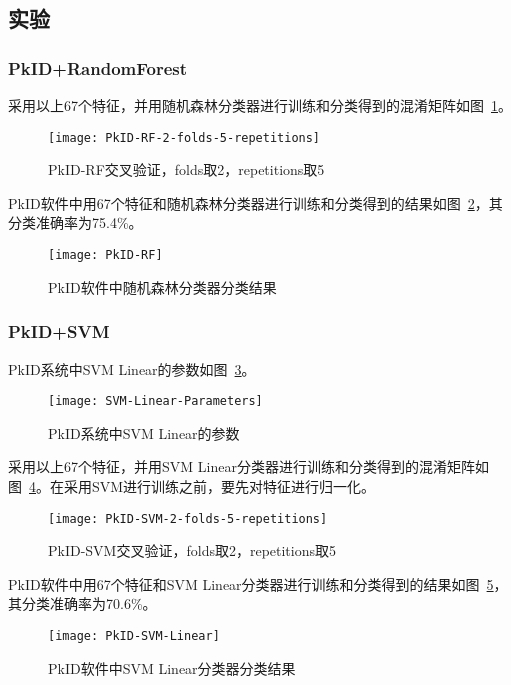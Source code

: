 \subsection{实验}
\subsubsection{PkID+RandomForest}
采用以上67个特征，并用随机森林分类器进行训练和分类得到的混淆矩阵如图~\ref{fig: PkID-RF-2-folds-5-repetitions}。

\begin{figure}[!ht]
\centering
\texttt{[image: PkID-RF-2-folds-5-repetitions]}
\caption{PkID-RF交叉验证，folds取2，repetitions取5}
\label{fig: PkID-RF-2-folds-5-repetitions}
\end{figure}

PkID软件中用67个特征和随机森林分类器进行训练和分类得到的结果如图~\ref{fig:PkID-RF}，其分类准确率为75.4\%。

\begin{figure}[!ht]
\centering
\texttt{[image: PkID-RF]}
\caption{PkID软件中随机森林分类器分类结果}
\label{fig:PkID-RF}
\end{figure}

\subsubsection{PkID+SVM}
PkID系统中SVM Linear的参数如图~\ref{fig:SVM-Linear-Parameters}。
\begin{figure}[!ht]
\centering
\texttt{[image: SVM-Linear-Parameters]}
\caption{PkID系统中SVM Linear的参数}
\label{fig:SVM-Linear-Parameters}
\end{figure}

采用以上67个特征，并用SVM Linear分类器进行训练和分类得到的混淆矩阵如图~\ref{fig: PkID-SVM-2-folds-5-repetitions}。在采用SVM进行训练之前，要先对特征进行归一化。
\begin{figure}[!ht]
\centering
\texttt{[image: PkID-SVM-2-folds-5-repetitions]}
\caption{PkID-SVM交叉验证，folds取2，repetitions取5}
\label{fig: PkID-SVM-2-folds-5-repetitions}
\end{figure}

PkID软件中用67个特征和SVM Linear分类器进行训练和分类得到的结果如图~\ref{fig:PkID-SVM-Linear}，其分类准确率为70.6\%。
\begin{figure}[!ht]
\centering
\texttt{[image: PkID-SVM-Linear]}
\caption{PkID软件中SVM Linear分类器分类结果}
\label{fig:PkID-SVM-Linear}
\end{figure}





